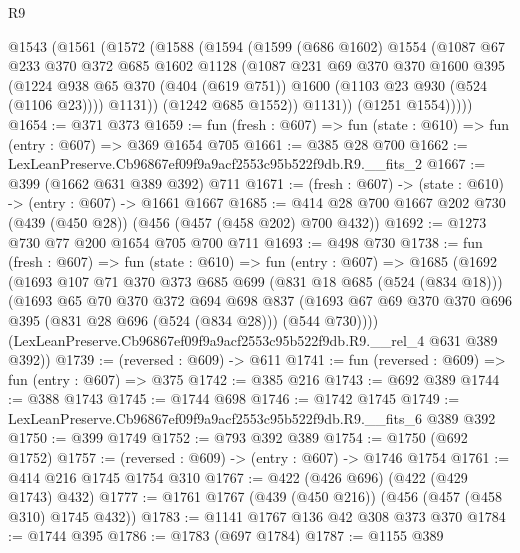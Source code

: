 \begin{lexlean}{R9}
\begin{coremodule}
      @1543
        (@1561
          (@1572
            (@1588
              (@1594
                (@1599
                  (@686 @1602)
                  @1554
                  (@1087
                    @67
                    @233
                    @370
                    @372
                    @685
                    @1602
                    @1128
                    (@1087
                      @231
                      @69
                      @370
                      @370
                      @1600
                      @395
                      (@1224
                        @938
                        @65
                        @370
                        (@404 (@619 @751))
                        @1600
                        (@1103 @23 @930 (@524 (@1106 @23))))
                      @1131))
                  (@1242 @685 @1552))
                @1131))
            (@1251 @1554)))))
@1654 := @371 @373
@1659 := fun (fresh : @607) => fun (state : @610) => fun (entry : @607) => @369 @1654 @705
@1661 := @385 @28 @700
@1662 := LexLeanPreserve.Cb96867ef09f9a9acf2553c95b522f9db.R9.__fits_2
@1667 := @399 (@1662 @631 @389 @392) @711
@1671 := (fresh : @607) -> (state : @610) -> (entry : @607) -> @1661 @1667
@1685 := @414 @28 @700 @1667 @202 @730 (@439 (@450 @28)) (@456 (@457 (@458 @202) @700 @432))
@1692 := @1273 @730 @77 @200 @1654 @705 @700 @711
@1693 := @498 @730
@1738 := fun (fresh : @607) =>
  fun (state : @610) =>
  fun (entry : @607) =>
  @1685
    (@1692
      (@1693
        @107
        @71
        @370
        @373
        @685
        @699
        (@831 @18 @685 (@524 (@834 @18)))
        (@1693
          @65
          @70
          @370
          @372
          @694
          @698
          @837
          (@1693 @67 @69 @370 @370 @696 @395 (@831 @28 @696 (@524 (@834 @28))) (@544 @730))))
      (LexLeanPreserve.Cb96867ef09f9a9acf2553c95b522f9db.R9.__rel_4 @631 @389 @392))
@1739 := (reversed : @609) -> @611
@1741 := fun (reversed : @609) => fun (entry : @607) => @375
@1742 := @385 @216
@1743 := @692 @389
@1744 := @388 @1743
@1745 := @1744 @698
@1746 := @1742 @1745
@1749 := LexLeanPreserve.Cb96867ef09f9a9acf2553c95b522f9db.R9.__fits_6 @389 @392
@1750 := @399 @1749
@1752 := @793 @392 @389
@1754 := @1750 (@692 @1752)
@1757 := (reversed : @609) -> (entry : @607) -> @1746 @1754
@1761 := @414 @216 @1745 @1754 @310
@1767 := @422 (@426 @696) (@422 (@429 @1743) @432)
@1777 := @1761 @1767 (@439 (@450 @216)) (@456 (@457 (@458 @310) @1745 @432))
@1783 := @1141 @1767 @136 @42 @308 @373 @370
@1784 := @1744 @395
@1786 := @1783 (@697 @1784)
@1787 := @1155 @389

\end{coremodule}
\end{lexlean}
